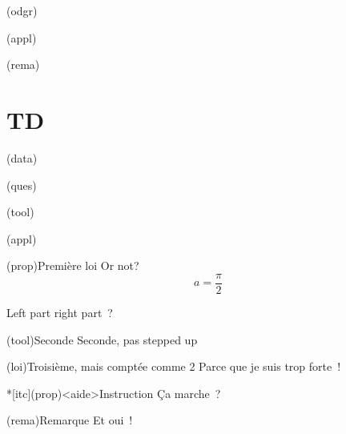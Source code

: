 \documentclass[a4paper, 10pt, garamond]{book}
\begin{document}
\begin{tcb*}(odgr){}

\end{tcb*}

\begin{tcb*}(appl){}

\end{tcb*}

\begin{tcb*}(rema){}

\end{tcb*}

\section{TD}

\begin{tcb*}(data){}

\end{tcb*}

\begin{tcb*}(ques){}

\end{tcb*}

\begin{tcb*}(tool){}

\end{tcb*}

\begin{tcb*}(appl){}

\end{tcb*}

\newpage

\begin{tcb*}(prop){Première loi}
	Or not?
	\[
		a = \frac{\pi}{2}
	\]
	\begin{isd}
		Left part
		\tcblower
		right part~?
	\end{isd}
\end{tcb*}

\begin{tcb}[lft](tool){Seconde}
	Seconde, pas stepped up
\end{tcb}

\begin{tcb*}(loi){Troisième, mais comptée comme 2}
	Parce que je suis trop forte~!
\end{tcb*}

\begin{tcb}*[itc](prop)<aide>{Instruction}
	Ça marche~?
\end{tcb}

\begin{tcb}(rema){Remarque}
	Et oui~!
\end{tcb}
\end{document}
